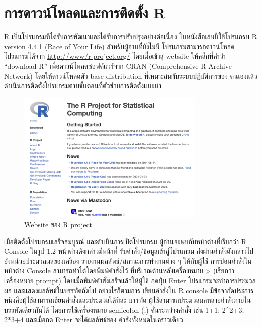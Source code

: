 \documentclass[
  a4paper,
]{book}
\begin{document}
\section{การดาวน์โหลดและการติดตั้ง
R}\label{uxe01uxe32uxe23uxe14uxe32uxe27uxe19uxe42uxe2buxe25uxe14uxe41uxe25uxe30uxe01uxe32uxe23uxe15uxe14uxe15uxe07-r}

R เป็นโปรแกรมที่ได้รับการพัฒนาและได้รับการปรับปรุงอย่างต่อเนื่อง ในหนังสือเล่มนี้ใช้โปรแกรม
R version 4.4.1 (Race of Your Life) สำหรับผู้อ่านที่ยังไม่มี
โปรแกรมสามารถดาวน์โหลดโปรแกรมได้จาก \url{http://www/r-project.org/}
โดยเมื่อเข้าสู่ website ให้คลิ้กที่คำว่า ``download R'' เพื่อดาวน์โหลดซอฟต์แวร์จาก CRAN
(Comprehensive R Archive Network) โดยให้ดาวน์โหลดตัว base distribution
ที่เหมาะสมกับระบบปฏิบัติการของ
ตนเองแล้วดำเนินการติดตั้งโปรแกรมตามขั้นตอนที่ตัวช่วยการติดตั้งแนะนำ

\begin{figure}

\begin{minipage}{\linewidth}

\begin{center}
\includegraphics[width=0.8\textwidth,height=\textheight]{img/01_Rwebsite.png}
\end{center}

\end{minipage}%

\caption{\label{fig-Rwebsite}Website ของ R project}

\end{figure}%

เมื่อติดตั้งโปรแกรมเสร็จสมบูรณ์ และดำเนินการเปิดโปรแกรม ผู้อ่านจะพบกับหน้าต่างที่เรียกว่า R
Console ในรูป 1.2 หน้าต่างดังกล่าวมีหน้าที่ รับคำสั่ง/ข้อมูลเข้าสู่โปรแกรม
ส่งผ่านคำสั่งดังกล่าวไปยังหน่วยประมวลผลของเครื่อง รายงานผลลัพธ์/สถานะการทำงานต่าง ๆ
ให้กับผู้ใช้ การป้อนคำสั่งในหน้าต่าง Console สามารถทำได้โดยพิมพ์คำสั่งไว้
ที่บริเวณด้านหลังเครื่องหมาย \textgreater{} (เรียกว่าเครื่องหมาย prompt)
โดยเมื่อพิมพ์คำสั่งเสร็จแล้วให้ผู้ใช้ กดปุ่ม Enter โปรแกรมจะทำการประมวลผล
และแสดงผลลัพธ์ในบรรทัดถัดไป อย่างไรก็ตามการ เขียนคำสั่งใน R console
มีข้อจำกัดประการหนึ่งคือผู้ใช้สามารถเขียนคำสั่งและประมวลได้ทีละ บรรทัด
ผู้ใช้สามารถประมวลผลหลายคำสั่งภายในบรรทัดเดียวกันได้ โดยการใช้เครื่องหมาย semicolon
(;) คั่นระหว่างคำสั่ง เช่น 1+1; 2\^{}2+3; 2*3+4 และเมื่อกด Enter จะได้ผลลัพธ์ของ
คำสั่งทั้งหมดในคราวเดียว
\end{document}
